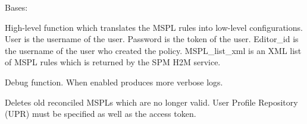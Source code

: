 \documentclass[letterpaper,10pt,oneside]{sphinxmanual}
\begin{document}

\begin{fulllineitems}
\label{online_workflow_manager:online_workflow_manager.WorkflowManager}
Bases: 

\begin{fulllineitems}
\label{online_workflow_manager:online_workflow_manager.WorkflowManager.DEBUG}
\end{fulllineitems}


\begin{fulllineitems}
\label{online_workflow_manager:online_workflow_manager.WorkflowManager.M2L}
High-level function which translates the MSPL rules into low-level configurations.
User is the username of the user.
Password is the token of the user.
Editor\_id is the username of the user who created the policy.
MSPL\_list\_xml is an XML list of MSPL rules which is returned by the SPM H2M service.

\end{fulllineitems}


\begin{fulllineitems}
\label{online_workflow_manager:online_workflow_manager.WorkflowManager.dbprint}
Debug function. When enabled
produces more verbose logs.

\end{fulllineitems}


\begin{fulllineitems}
\label{online_workflow_manager:online_workflow_manager.WorkflowManager.delete_all_rec_mspl}
Deletes old reconciled MSPLs which are no longer valid. 
User Profile Repository (UPR) must be specified as well as the access token.


\end{fulllineitems}
\end{fulllineitems}
\end{document}
